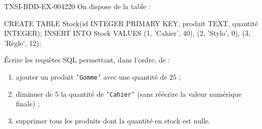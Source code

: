 \begin{exercice}{TNSI-BDD-EX-004}{2}{20}
On dispose de la table :
\begin{sql}
CREATE TABLE Stock(id INTEGER PRIMARY KEY, produit TEXT, quantité INTEGER);
INSERT INTO Stock VALUES (1, 'Cahier', 40), (2, 'Stylo', 0), (3, 'Règle', 12);
\end{sql}
Écrire les requêtes SQL permettant, dans l'ordre, de :
\begin{enumerate}
  \item ajouter un produit \texttt{'Gomme'} avec une quantité de $25$ ;
  \item diminuer de $5$ la quantité de \texttt{'Cahier'} (sans réécrire la valeur numérique finale) ;
  \item supprimer tous les produits dont la quantité en stock est nulle.
\end{enumerate}
\end{exercice}
